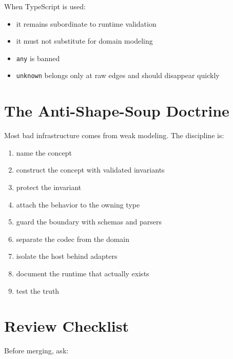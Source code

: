 When TypeScript is used:

\begin{itemize}
\tightlist
\item
  it remains subordinate to runtime validation
\item
  it must not substitute for domain modeling
\item
  \texttt{a\allowbreak{}n\allowbreak{}y} is banned
\item
  \texttt{u\allowbreak{}n\allowbreak{}k\allowbreak{}n\allowbreak{}o\allowbreak{}w\allowbreak{}n} belongs only at raw edges and should disappear quickly
\end{itemize}

\section{The Anti-Shape-Soup Doctrine}\label{record-060-the-anti-shape-soup-doctrine}

Most bad infrastructure comes from weak modeling. The discipline is:

\begin{enumerate}
\def\labelenumi{\arabic{enumi}.}
\tightlist
\item
  name the concept
\item
  construct the concept with validated invariants
\item
  protect the invariant
\item
  attach the behavior to the owning type
\item
  guard the boundary with schemas and parsers
\item
  separate the codec from the domain
\item
  isolate the host behind adapters
\item
  document the runtime that actually exists
\item
  test the truth
\end{enumerate}

\section{Review Checklist}\label{record-060-review-checklist}

Before merging, ask:

